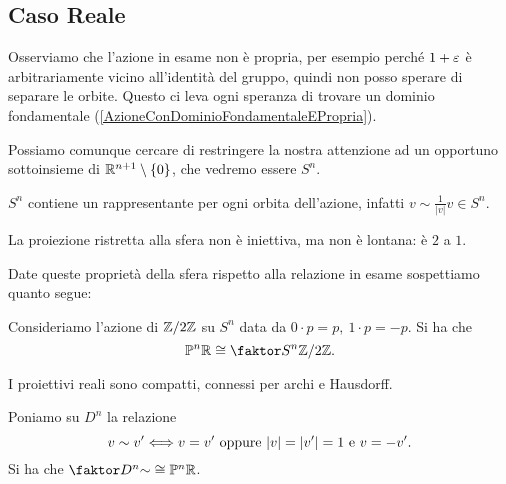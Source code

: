 \begin{multicols*}{2}
\subsection{Caso Reale}
Osserviamo che l'azione in esame non \`e propria, per esempio perch\'e $1+\varepsilon$ \`e arbitrariamente vicino all'identit\`a del gruppo, quindi non posso sperare di separare le orbite. Questo ci leva ogni speranza di trovare un dominio fondamentale (\ref{AzioneConDominioFondamentaleEPropria}).

Possiamo comunque cercare di restringere la nostra attenzione ad un opportuno sottoinsieme di $\mathbb{R}^{n+1}\setminus\{0\}$, che vedremo essere $S^n$.

\begin{remark}
$S^n$ contiene un rappresentante per ogni orbita dell'azione, infatti $v\sim \frac1{|v|}v\in S^n$.
\end{remark}
\begin{remark}
La proiezione ristretta alla sfera non \`e iniettiva, ma non \`e lontana: \`e $2$ a $1$.
\end{remark}
\noindent Date queste propriet\`a della sfera rispetto alla relazione in esame sospettiamo quanto segue:

\begin{theorem}\label{TopologiaProiettivoRealeDaSfera}
Consideriamo l'azione di ${\mathbb{Z}/2\mathbb{Z}}$ su $S^n$ data da $0\cdot p=p,\ 1\cdot p=-p$. Si ha che
\[\Pj^n\R\cong \quot{S^n}{\znz2}.\]
\end{theorem}
\begin{corollary}
I proiettivi reali sono compatti, connessi per archi e Hausdorff.
\end{corollary}

\begin{theorem}\label{TopologiaProiettivoRealeDaDisco}
Poniamo su $D^n$ la relazione \[v\sim v'\Longleftrightarrow v=v'\text{ oppure }|v|=|v'|=1\text{ e }v=-v'.\]
Si ha che $\quot {D^n}\sim\cong \Pj^n\R$.
\end{theorem}


\end{multicols*}
